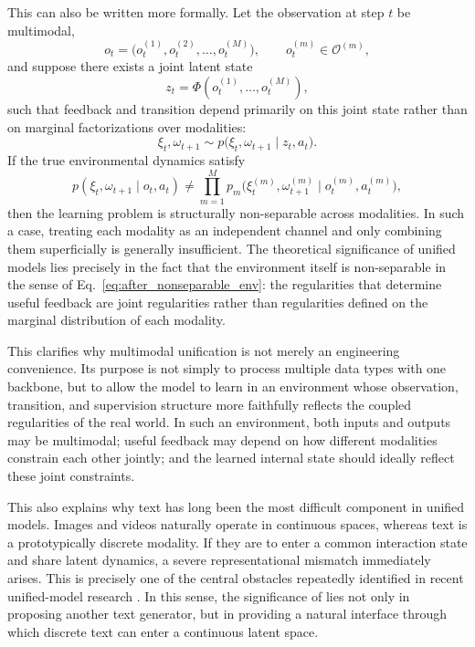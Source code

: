 This can also be written more formally. Let the observation at step $t$ be multimodal,
\begin{equation}
o_t=\big(o_t^{(1)},o_t^{(2)},\dots,o_t^{(M)}\big),
\qquad
o_t^{(m)}\in\mathcal O^{(m)},
\label{eq:after_multimodal_obs}
\end{equation}
and suppose there exists a joint latent state
\begin{equation}
z_t=\Phi\!\left(o_t^{(1)},\dots,o_t^{(M)}\right),
\label{eq:after_joint_latent}
\end{equation}
such that feedback and transition depend primarily on this joint state rather than on marginal factorizations over modalities:
\begin{equation}
\xi_t,\omega_{t+1}
\sim
p\big(\xi_t,\omega_{t+1}\mid z_t,a_t\big).
\label{eq:after_joint_feedback}
\end{equation}
If the true environmental dynamics satisfy
\begin{equation}
p(\xi_t,\omega_{t+1}\mid o_t,a_t)
\neq
\prod_{m=1}^{M}
p_m\big(\xi_t^{(m)},\omega_{t+1}^{(m)} \mid o_t^{(m)}, a_t^{(m)}\big),
\label{eq:after_nonseparable_env}
\end{equation}
then the learning problem is structurally non-separable across modalities. In such a case, treating each modality as an independent channel and only combining them superficially is generally insufficient. The theoretical significance of unified models lies precisely in the fact that the environment itself is non-separable in the sense of Eq.~\eqref{eq:after_nonseparable_env}: the regularities that determine useful feedback are joint regularities rather than regularities defined on the marginal distribution of each modality.

This clarifies why multimodal unification is not merely an engineering convenience. Its purpose is not simply to process multiple data types with one backbone, but to allow the model to learn in an environment whose observation, transition, and supervision structure more faithfully reflects the coupled regularities of the real world. In such an environment, both inputs and outputs may be multimodal; useful feedback may depend on how different modalities constrain each other jointly; and the learned internal state should ideally reflect these joint constraints.

This also explains why text has long been the most difficult component in unified models. Images and videos naturally operate in continuous spaces, whereas text is a prototypically discrete modality. If they are to enter a common interaction state and share latent dynamics, a severe representational mismatch immediately arises. This is precisely one of the central obstacles repeatedly identified in recent unified-model research \citep{deng2025emerging}. In this sense, the significance of \method lies not only in proposing another text generator, but in providing a natural interface through which discrete text can enter a continuous latent space.

